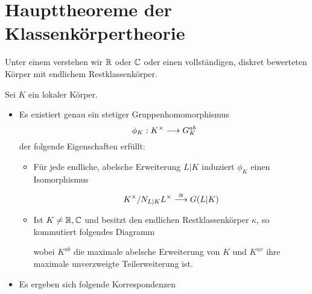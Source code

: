 \section{Haupttheoreme der Klassenkörpertheorie}
Unter einem  verstehen wir $\mathbb{R}$ oder $\mathbb{C}$ oder einen vollständigen, diskret bewerteten Körper mit endlichem Restklassenkörper.

Sei $K$ ein lokaler Körper.
\begin{itemize}
\item Es existiert genau ein stetiger Gruppenhomomorphismus
\[ \phi_K : K^\times \overset{}{\longrightarrow} G_K^{ab} \]
der folgende Eigenschaften erfüllt:
\begin{itemize}
\item Für jede endliche, abelsche Erweiterung $L|K$ induziert $\phi_K$ einen Isomorphismus
\[ K^\times / N_{L|K} L^\times \overset{\overset{}{\cong}}{\longrightarrow} G(L|K) \]
\item Ist $K\neq \mathbb{R},\mathbb{C}$ und besitzt den endlichen Restklassenkörper $\kappa$, so kommutiert folgendes Diagramm
\begin{center}
\end{center}
wobei $K^{ab}$ die maximale abelsche Erweiterung von $K$ und $K^{uv}$ ihre maximale unverzweigte Teilerweiterung ist.
\end{itemize}
\item Es ergeben sich folgende Korrespondenzen
\begin{center}
\end{center}
\end{itemize}

